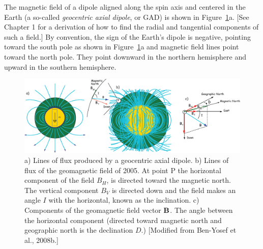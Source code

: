 The magnetic field of a dipole aligned along the spin axis and centered in the Earth (a so-called 
%
{\it geocentric axial dipole}, or GAD) is shown in Figure~\ref{fig:coord}a. [See Chapter 1  for a derivation of  how to find the radial and tangential components of such a field.]   By convention, the sign of the Earth's dipole is negative, pointing toward the south pole as shown in Figure~\ref{fig:coord}a and magnetic field lines point toward the north pole.  They point  downward in the northern hemisphere and upward in the southern hemisphere.  
\begin{figure}[htb]
\centering  \includegraphics[width=14.5 cm]{EPSfiles/components.eps}
\caption{a) Lines of flux produced by  a geocentric axial dipole.  b) Lines of flux  of the geomagnetic field of 2005.   At point P the horizontal component of the  field $B_H$, is directed toward the magnetic north.  The vertical component $B_V$ is directed down and the field makes an angle $I$ with the horizontal, known as the
inclination.  c) Components of the geomagnetic field vector $\hbox{\bf B}$.  The angle between the horizontal component (directed toward magnetic north and geographic north is the 
declination $D$.) [Modified from Ben-Yosef et al., 2008b.] 
}
\label{fig:coord}
\end{figure}
\nocite{benyosef08b}

